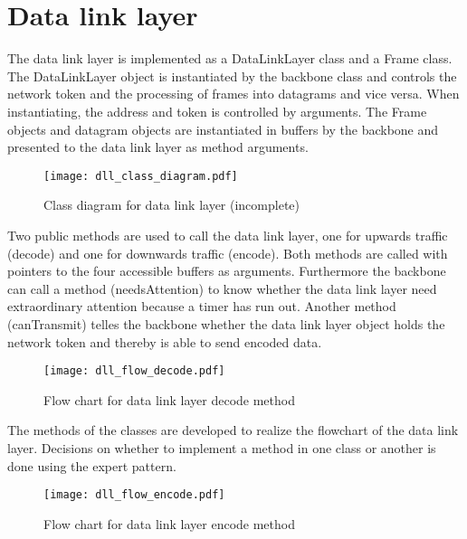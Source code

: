 \section{Data link layer}
The data link layer is implemented as a DataLinkLayer class and a Frame class.
The DataLinkLayer object is instantiated by the backbone class and controls the
network token and the processing of frames into datagrams and vice versa. When
instantiating, the address and token is controlled by arguments. The Frame
objects and datagram objects are instantiated in buffers by the backbone and
presented to the data link layer as method arguments.

\begin{figure}[htb]
	\begin{center}
	\texttt{[image: dll\_class\_diagram.pdf]}
	\caption{Class diagram for data link layer (incomplete)}
	\label{fig:class_diag_for_datalink}	
	\end{center}
\end{figure}

Two public methods are used to call the data link layer, one for upwards traffic
(decode) and one for downwards traffic (encode). Both methods are called with
pointers to the four accessible buffers as arguments. Furthermore the backbone
can call a method (needsAttention) to know whether the data link layer need
extraordinary attention because a timer has run out. Another method
(canTransmit) telles the backbone whether the data link layer object holds the
network token and thereby is able to send encoded data.

\begin{figure}[htb]
	\begin{center}
	\texttt{[image: dll\_flow\_decode.pdf]}
	\caption{Flow chart for data link layer decode method}
	\label{fig:dll_flow_decode}	
	\end{center}
\end{figure}

The methods of the classes are developed to realize the flowchart of the data
link layer. Decisions on whether to implement a method in one class or another
is done using the expert pattern.

\begin{figure}[htb]
	\begin{center}
	\texttt{[image: dll\_flow\_encode.pdf]}
	\caption{Flow chart for data link layer encode method}
	\label{fig:dll_flow_encode}	
	\end{center}
\end{figure}
